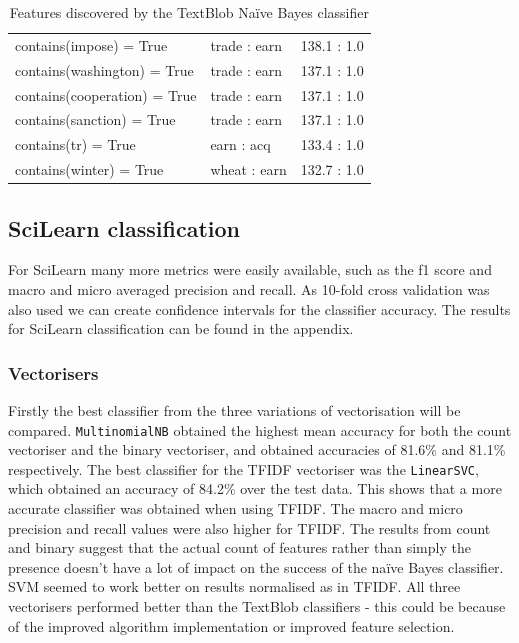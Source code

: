 \documentclass{article}
\begin{document}
\begin{table}
\begin{tabular}{l|l|l}
        contains(impose) = True  &          trade : earn & 138.1 : 1.0\\
    contains(washington) = True   &         trade : earn &    137.1 : 1.0\\
   contains(cooperation) = True   &         trade : earn & 137.1 : 1.0\\
      contains(sanction) = True  &          trade : earn  &    137.1 : 1.0\\
            contains(tr) = True &            earn : acq  &    133.4 : 1.0\\
        contains(winter) = True  &          wheat : earn  & 132.7 : 1.0\\
\end{tabular}
\caption{Features discovered by the TextBlob Na{\"i}ve Bayes classifier}
\end{table}

\subsection{SciLearn classification}
For SciLearn many more metrics were easily available, such as the f1 score and macro and micro averaged precision and recall. As 10-fold cross validation was also used we can create confidence intervals for the classifier accuracy. The results for SciLearn classification can be found in the appendix.

\subsubsection{Vectorisers}
Firstly the best classifier from the three variations of vectorisation will be compared. \verb|MultinomialNB| obtained the highest mean accuracy for both the count vectoriser and the binary vectoriser, and obtained accuracies of 81.6\% and 81.1\% respectively. The best classifier for the TFIDF vectoriser was the  \verb|LinearSVC|, which obtained an accuracy of 84.2\% over the test data. This shows that a more accurate classifier was obtained when using TFIDF. The macro and micro precision and recall values were also higher for TFIDF. The results from count and binary suggest that the actual count of features rather than simply the presence doesn't have a lot of impact on the success of the na{\"i}ve Bayes classifier. SVM seemed to work better on results normalised as in TFIDF. All three vectorisers performed better than the TextBlob classifiers - this could be because of the improved algorithm implementation or improved feature selection.
\end{document}
